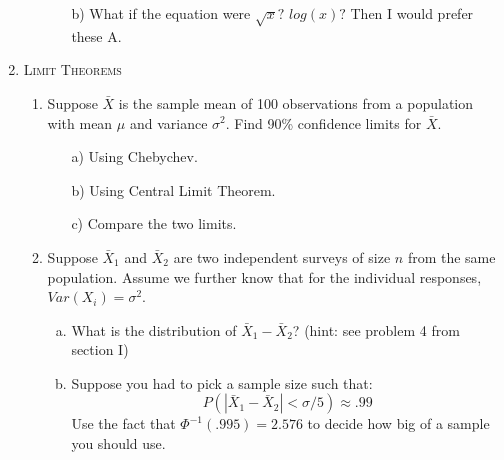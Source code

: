 \documentclass[11pt,letterpaper]{article}
\numberwithin{equation}{section}
\begin{document}
\begin{enumerate}[I]
\begin{enumerate}[1)]
\begin{enumerate}
\item[b)] What if the equation were  $\sqrt{x}?$ $log(x)?$  Then I would prefer these A.
\end{enumerate}
\end{enumerate}


\item \textsc{Limit Theorems} 

\begin{enumerate}[1)]

\item Suppose $\bar{X}$ is the sample mean of 100 observations from a population with mean $\mu$ and variance $\sigma^2$.  Find 90\% confidence limits for $\bar{X}$.
\begin{enumerate}
\item[a)] Using Chebychev.
\item[b)] Using Central Limit Theorem.
\item[c)] Compare the two limits.
\end{enumerate}

\item Suppose $\bar{X}_1$ and $\bar{X}_2$ are two independent surveys of size $n$ from the same population.  Assume we further know that for the individual responses, $Var(X_i)=\sigma^2$.
\begin{enumerate}[a)]
\item What is the distribution of $\bar{X}_1-\bar{X}_2$? (hint: see problem 4 from section I)
\item Suppose you had to pick a sample size such that: $$P(|\bar{X}_1-\bar{X}_2| < \sigma/5) \approx .99$$
 Use the fact that $\Phi^{-1}(.995)=2.576$ to decide how big of a sample you should use.
\end{enumerate}


\end{enumerate}


\end{enumerate}
\end{document}
